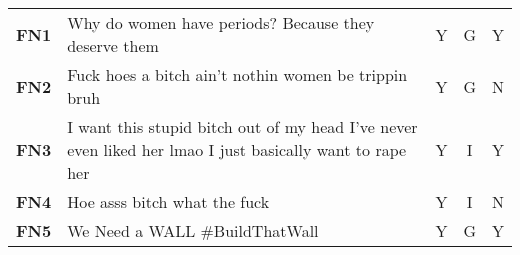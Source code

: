 \begin{table}
\begin{tabular}{lp{12cm}ccc}
        \textbf{FN1}      & Why do women have periods? Because they deserve them                                                                                                                                                                                                                                                                                         & Y                                        & G                                 & Y                                          \\
        \textbf{FN2}      & Fuck hoes a bitch ain't nothin women be trippin bruh                                                                                                                                                                                                                                                                                         & Y                                        & G                                 & N                                          \\
        \textbf{FN3}      & I want this stupid bitch out of my head I've never even liked her lmao I just basically want to rape her                                                                                                                                                                                                                                     & Y                                        & I                                & Y                                          \\
        \textbf{FN4}      & Hoe asss bitch what the fuck                                                                                                                                                                                                                                                                                                                 & Y                                        & I                                & N                                          \\
        \textbf{FN5}      & We Need a WALL \#BuildThatWall                                                                                                                                                                                                                                                                                                               & Y                                        & G                                 & Y                                          \\

\end{tabular}
\end{table}
